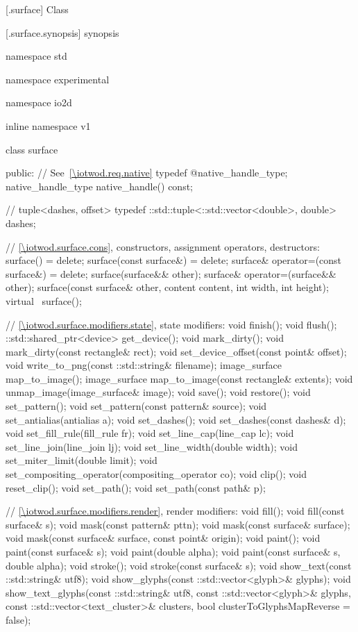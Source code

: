  [\iotwod.surface] {Class }

 [\iotwod.surface.synopsis] { synopsis}

\begin{codeblock}
namespace std { namespace experimental { namespace io2d { inline namespace v1 {
  class surface {
  public:
    // See~\ref{\iotwod.req.native}
    typedef @\impdef@ native_handle_type;
    native_handle_type native_handle() const;

    // tuple<dashes, offset>
    typedef ::std::tuple<::std::vector<double>, double> dashes;

    // \ref{\iotwod.surface.cons}, constructors, assignment operators, destructors:
    surface() = delete;
    surface(const surface&) = delete;
    surface& operator=(const surface&) = delete;
    surface(surface&& other);
    surface& operator=(surface&& other);
    surface(const surface& other, content content, int width, int height);
    virtual ~surface();

    // \ref{\iotwod.surface.modifiers.state}, state modifiers:
    void finish();
    void flush();
    ::std::shared_ptr<device> get_device();
    void mark_dirty();
    void mark_dirty(const rectangle& rect);
    void set_device_offset(const point& offset);
    void write_to_png(const ::std::string& filename);
    image_surface map_to_image();
    image_surface map_to_image(const rectangle& extents);
    void unmap_image(image_surface& image);
    void save();
    void restore();
    void set_pattern();
    void set_pattern(const pattern& source);
    void set_antialias(antialias a);
    void set_dashes();
    void set_dashes(const dashes& d);
    void set_fill_rule(fill_rule fr);
    void set_line_cap(line_cap lc);
    void set_line_join(line_join lj);
    void set_line_width(double width);
    void set_miter_limit(double limit);
    void set_compositing_operator(compositing_operator co);
    void clip();
    void reset_clip();
    void set_path();
    void set_path(const path& p);

    // \ref{\iotwod.surface.modifiers.render}, render modifiers:
    void fill();
    void fill(const surface& s);
    void mask(const pattern& pttn);
    void mask(const surface& surface);
    void mask(const surface& surface, const point& origin);
    void paint();
    void paint(const surface& s);
    void paint(double alpha);
    void paint(const surface& s, double alpha);
    void stroke();
    void stroke(const surface& s);
    void show_text(const ::std::string& utf8);
    void show_glyphs(const ::std::vector<glyph>& glyphs);
    void show_text_glyphs(const ::std::string& utf8,
      const ::std::vector<glyph>& glyphs,
      const ::std::vector<text_cluster>& clusters, 
      bool clusterToGlyphsMapReverse = false);

}}}}}
\end{codeblock}
